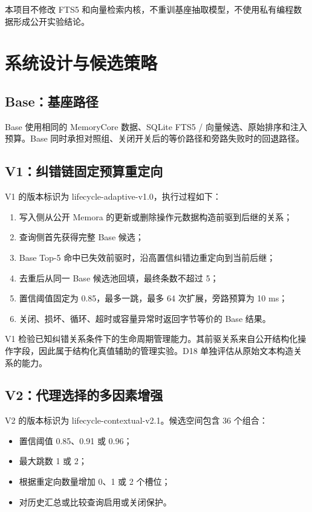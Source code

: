 本项目不修改 FTS5 和向量检索内核，不重训基座抽取模型，不使用私有编程数据形成公开实验结论。

\section{系统设计与候选策略}

\subsection{Base：基座路径}

Base 使用相同的 MemoryCore 数据、SQLite FTS5 / 向量候选、原始排序和注入预算。Base 同时承担对照组、关闭开关后的等价路径和旁路失败时的回退路径。

\subsection{V1：纠错链固定预算重定向}

V1 的版本标识为 lifecycle-adaptive-v1.0，执行过程如下：

\begin{enumerate}
\item 写入侧从公开 Memora 的更新或删除操作元数据构造前驱到后继的关系；
\item 查询侧首先获得完整 Base 候选；
\item Base Top-5 命中已失效前驱时，沿高置信纠错边重定向到当前后继；
\item 去重后从同一 Base 候选池回填，最终条数不超过 5；
\item 置信阈值固定为 0.85，最多一跳，最多 64 次扩展，旁路预算为 10 ms；
\item 关闭、损坏、循环、超时或容量异常时返回字节等价的 Base 结果。
\end{enumerate}

V1 检验已知纠错关系条件下的生命周期管理能力。其前驱关系来自公开结构化操作字段，因此属于结构化真值辅助的管理实验。D18 单独评估从原始文本构造关系的能力。

\subsection{V2：代理选择的多因素增强}

V2 的版本标识为 lifecycle-contextual-v2.1。候选空间包含 36 个组合：

\begin{itemize}
\item 置信阈值 0.85、0.91 或 0.96；
\item 最大跳数 1 或 2；
\item 根据重定向数量增加 0、1 或 2 个槽位；
\item 对历史汇总或比较查询启用或关闭保护。
\end{itemize}

